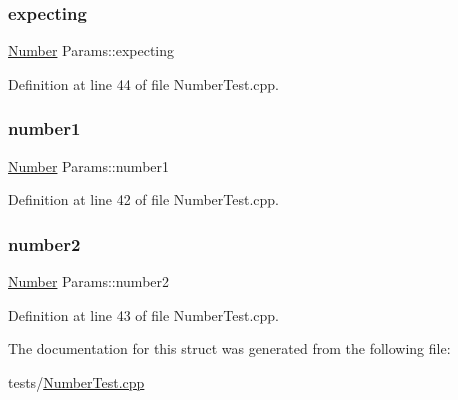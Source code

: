 \subsubsection{\texorpdfstring{expecting}{expecting}}
{\footnotesize\ttfamily \hyperlink{classteam22_1_1_math_1_1_number}{Number} Params\+::expecting}



Definition at line 44 of file Number\+Test.\+cpp.

\mbox{\label{struct_params_abfbdd38f4448b9722ca7faeffdf4ef36}} 
\subsubsection{\texorpdfstring{number1}{number1}}
{\footnotesize\ttfamily \hyperlink{classteam22_1_1_math_1_1_number}{Number} Params\+::number1}



Definition at line 42 of file Number\+Test.\+cpp.

\mbox{\label{struct_params_af25f02c145e03d78112c0a3e7258155f}} 
\subsubsection{\texorpdfstring{number2}{number2}}
{\footnotesize\ttfamily \hyperlink{classteam22_1_1_math_1_1_number}{Number} Params\+::number2}



Definition at line 43 of file Number\+Test.\+cpp.



The documentation for this struct was generated from the following file\+:\begin{DoxyCompactItemize}
\item 
tests/\hyperlink{_number_test_8cpp}{Number\+Test.\+cpp}\end{DoxyCompactItemize}
